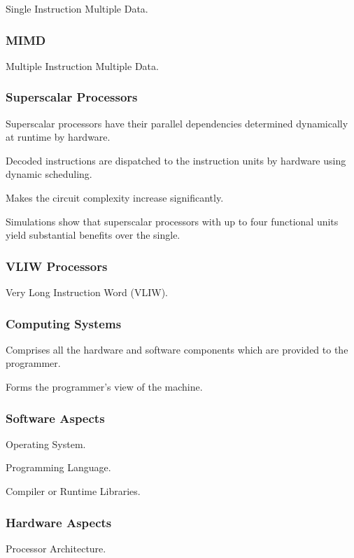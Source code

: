 \documentclass{article}
\begin{document}
Single Instruction Multiple Data.

\subsubsection{MIMD}

Multiple Instruction Multiple Data.

\subsubsection{Superscalar Processors}

Superscalar processors have their parallel dependencies determined dynamically at runtime by hardware.

Decoded instructions are dispatched to the instruction units by hardware using dynamic scheduling.

Makes the circuit complexity increase significantly.

Simulations show that superscalar processors with up to four functional units yield substantial benefits over the single.

\subsubsection{VLIW Processors}

Very Long Instruction Word (VLIW).

\subsubsection{Computing Systems}

Comprises all the hardware and software components which are provided to the programmer.

Forms the programmer's view of the machine.

\subsubsection{Software Aspects}

Operating System.

Programming Language.

Compiler or Runtime Libraries.

\subsubsection{Hardware Aspects}

Processor Architecture.
\end{document}
